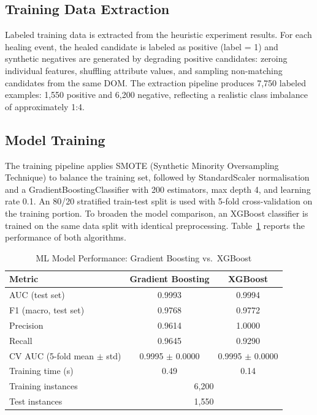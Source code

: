\documentclass[12pt]{article}
\begin{document}
\subsection{Training Data Extraction}

Labeled training data is extracted from the heuristic experiment results. For each healing event, the healed candidate is labeled as positive (label = 1) and synthetic negatives are generated by degrading positive candidates: zeroing individual features, shuffling attribute values, and sampling non-matching candidates from the same DOM. The extraction pipeline produces 7,750 labeled examples: 1,550 positive and 6,200 negative, reflecting a realistic class imbalance of approximately 1:4.

\subsection{Model Training}

The training pipeline applies SMOTE (Synthetic Minority Oversampling Technique) to balance the training set, followed by StandardScaler normalisation and a GradientBoostingClassifier with 200 estimators, max depth 4, and learning rate 0.1. An 80/20 stratified train-test split is used with 5-fold cross-validation on the training portion. To broaden the model comparison, an XGBoost classifier is trained on the same data split with identical preprocessing. Table~\ref{tab:model_metrics} reports the performance of both algorithms.

\begin{table}[H]
\centering
\caption{ML Model Performance: Gradient Boosting vs.\ XGBoost}
\label{tab:model_metrics}
\begin{tabular}{lcc}
\toprule
Metric & Gradient Boosting & XGBoost \\
\midrule
AUC (test set) & 0.9993 & 0.9994 \\
F1 (macro, test set) & 0.9768 & 0.9772 \\
Precision & 0.9614 & 1.0000 \\
Recall & 0.9645 & 0.9290 \\
CV AUC (5-fold mean $\pm$ std) & 0.9995 $\pm$ 0.0000 & 0.9995 $\pm$ 0.0000 \\
Training time (s) & 0.49 & 0.14 \\
Training instances & \multicolumn{2}{c}{6,200} \\
Test instances & \multicolumn{2}{c}{1,550} \\
\bottomrule
\end{tabular}
\end{table}
\end{document}
